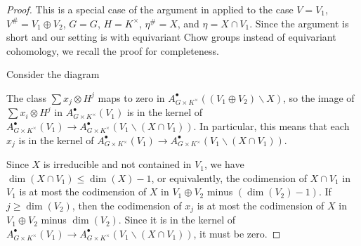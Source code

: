 \documentclass[12pt]{amsart}
\newcommand{\mb}{\mathbb}
\newcommand{\pt}{{\rm pt}}
\theoremstyle{plain}
\theoremstyle{definition}
\theoremstyle{remark}
\begin{document}
\begin{proof}
This is a special case of the argument in \cite[Theorem 2.1]{FR07} applied to the case $V=V_1$, $V^{\#}=V_1\oplus V_2$, $G=G$, $H=K^{\times}$, $\eta^{\#}=X$, and $\eta=X\cap V_1$. Since the argument is short and our setting is with equivariant Chow groups instead of equivariant cohomology, we recall the proof for completeness. 

Consider the diagram
\begin{center}
\end{center}
The class $\sum x_j\otimes H^j$ maps to zero in $A_{G\times K^{\times}}^{\bullet}((V_1\oplus V_2)\backslash X)$, so the image of $\sum x_i\otimes H^j$ in $A_{G\times K^{\times}}^{\bullet}(V_1) $ is in the kernel of $A_{G\times K^{\times}}^{\bullet}(V_1) \to A_{G\times K^{\times}}^{\bullet}(V_1\backslash (X\cap V_1))$. In particular, this means that each $x_j$ is in the kernel of $A_{G\times K^{\times}}^{\bullet}(V_1) \to A_{G\times K^{\times}}^{\bullet}(V_1\backslash (X\cap V_1))$. 

Since $X$ is irreducible and not contained in $V_1$, we have $\dim(X\cap V_1)\leq \dim(X)-1$, or equivalently, the codimension of $X\cap V_1$ in $V_1$ is at most the codimension of $X$ in $V_1\oplus V_2$ minus $(\dim(V_2)-1)$. If $j\geq \dim(V_2)$, then the codimension of $x_j$ is at most the codimension of $X$ in $V_1\oplus V_2$ minus $\dim(V_2)$. Since it is in the kernel of $A_{G\times K^{\times}}^{\bullet}(V_1) \to A_{G\times K^{\times}}^{\bullet}(V_1\backslash (X\cap V_1))$, it must be zero.
\end{proof}
\end{document}
